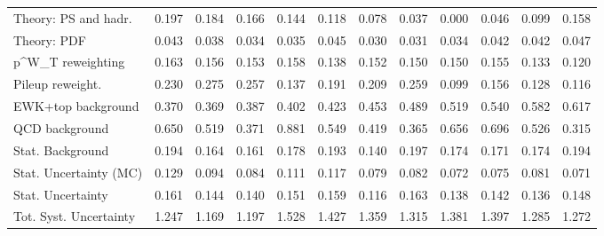 \begin{tabular}{l|p{0.6cm}p{0.6cm}p{0.6cm}p{0.6cm}p{0.6cm}p{0.6cm}p{0.6cm}p{0.6cm}p{0.6cm}p{0.6cm}p{0.6cm}}
Theory: PS and hadr.                     & 0.197 & 0.184 & 0.166 & 0.144 & 0.118 & 0.078 & 0.037 & 0.000 & 0.046 & 0.099 & 0.158 \\
Theory: PDF                              & 0.043 & 0.038 & 0.034 & 0.035 & 0.045 & 0.030 & 0.031 & 0.034 & 0.042 & 0.042 & 0.047 \\
p^{W}_{T} reweighting                    & 0.163 & 0.156 & 0.153 & 0.158 & 0.138 & 0.152 & 0.150 & 0.150 & 0.155 & 0.133 & 0.120 \\
Pileup reweight.                         & 0.230 & 0.275 & 0.257 & 0.137 & 0.191 & 0.209 & 0.259 & 0.099 & 0.156 & 0.128 & 0.116 \\
EWK+top background                       & 0.370 & 0.369 & 0.387 & 0.402 & 0.423 & 0.453 & 0.489 & 0.519 & 0.540 & 0.582 & 0.617 \\
QCD background                           & 0.650 & 0.519 & 0.371 & 0.881 & 0.549 & 0.419 & 0.365 & 0.656 & 0.696 & 0.526 & 0.315 \\
Stat. Background                         & 0.194 & 0.164 & 0.161 & 0.178 & 0.193 & 0.140 & 0.197 & 0.174 & 0.171 & 0.174 & 0.194 \\
Stat. Uncertainty (MC)                   & 0.129 & 0.094 & 0.084 & 0.111 & 0.117 & 0.079 & 0.082 & 0.072 & 0.075 & 0.081 & 0.071 \\
\hline
Stat. Uncertainty                        & 0.161 & 0.144 & 0.140 & 0.151 & 0.159 & 0.116 & 0.163 & 0.138 & 0.142 & 0.136 & 0.148 \\
\hline
Tot. Syst. Uncertainty                   & 1.247 & 1.169 & 1.197 & 1.528 & 1.427 & 1.359 & 1.315 & 1.381 & 1.397 & 1.285 & 1.272 \\
\hline
\end{tabular}
